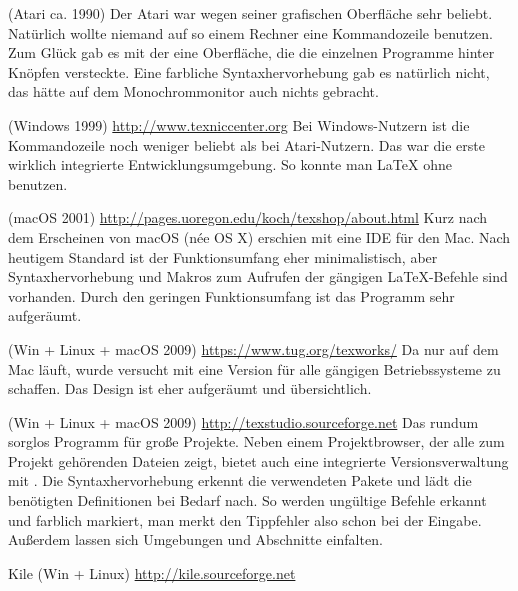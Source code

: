 \begin{labeling}{}
\item[\Program{TeXShell}] (Atari ca. 1990) Der Atari war wegen seiner
  grafischen Oberfläche sehr beliebt.  Natürlich wollte niemand auf so
  einem Rechner eine Kommandozeile benutzen.  Zum Glück gab es mit der
   eine Oberfläche, die die einzelnen Programme hinter
  Knöpfen versteckte.  Eine farbliche Syntaxhervorhebung gab es natürlich
  nicht, das hätte auf dem Monochrommonitor auch nichts gebracht.

\item[\Program{TexnicCenter}] (Windows 1999)
  \url{http://www.texniccenter.org}  Bei Windows-Nutzern ist die
  Kommandozeile noch weniger beliebt als bei Atari-Nutzern.  Das
   war die erste wirklich integrierte
  Entwicklungsumgebung.  So konnte man \LaTeX{} ohne 
  benutzen.

\item[\Program{Texshop}] (macOS 2001)
  \url{http://pages.uoregon.edu/koch/texshop/about.html}  Kurz nach dem
  Erscheinen von macOS (née OS X) erschien mit  eine IDE
  für den Mac.  Nach heutigem Standard ist der Funktionsumfang eher
  minimalistisch, aber Syntaxhervorhebung und Makros zum Aufrufen der
  gängigen \LaTeX{}-Befehle sind vorhanden.  Durch den geringen
  Funktionsumfang ist das Programm sehr aufgeräumt.

\item[\Program{TeXworks}] (Win + Linux + macOS 2009)
  \url{https://www.tug.org/texworks/}  Da  nur auf dem Mac
  läuft, wurde versucht mit  eine Version für alle
  gängigen Betriebssysteme zu schaffen.  Das Design ist eher aufgeräumt und
  übersichtlich.

\item[\Program{TeXStudio}] (Win + Linux + macOS 2009)
  \url{http://texstudio.sourceforge.net}  Das rundum sorglos Programm für
  große Projekte. Neben einem Projektbrowser, der alle zum Projekt
  gehörenden Dateien zeigt, bietet  auch eine integrierte
  Versionsverwaltung mit .  Die Syntaxhervorhebung erkennt die
  verwendeten Pakete und lädt die benötigten Definitionen bei Bedarf nach.
  So werden ungültige Befehle erkannt und farblich markiert, man merkt den
  Tippfehler also schon bei der Eingabe. Außerdem lassen sich Umgebungen
  und Abschnitte einfalten.

\item[Kile] (Win + Linux) \url{http://kile.sourceforge.net}

\end{labeling}

